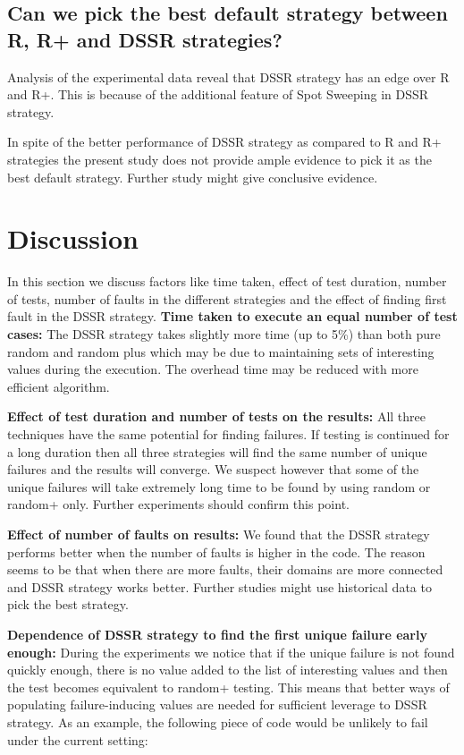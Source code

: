 \documentclass{acm_proc_article-sp}
\begin{document}
\subsection{Can we pick the best default strategy between R, R+ and DSSR strategies?}

Analysis of the experimental data reveal that DSSR strategy has an edge over R and R+. This is because of the additional feature of Spot Sweeping in DSSR strategy.

In spite of the better performance of DSSR strategy as compared to R and R+ strategies the present study does not provide ample evidence to pick it as the best default strategy. Further study might give conclusive evidence. 





\section{Discussion}\label{sec:discussion}
In this section we discuss factors like time taken, effect of test duration, number of tests, number of faults in the different strategies and the effect of finding first fault in the DSSR strategy.
\textbf{Time taken to execute an equal number of test cases:}
The DSSR strategy takes slightly more time (up to 5\%) than both pure random and random plus which may be due to maintaining sets of interesting values during the execution. The overhead time may be reduced with more efficient algorithm. 

\textbf{Effect of test duration and number of tests on the results:}
All three techniques have the same potential for finding failures. If testing is continued for a long duration then all three strategies will find the same number of unique failures and the results will converge. We suspect however that some of the unique failures will take extremely long time to be found by using random or random+ only. Further experiments should confirm this point.


\textbf{Effect of number of faults on results:} 
We found that the DSSR strategy performs better when the number of faults is higher in the code. The reason seems to be that when there are more faults, their domains are more connected and DSSR strategy works better. Further studies might use historical data to pick the best strategy.

\textbf{Dependence of DSSR strategy to find the first unique failure early enough:}
During the experiments we notice that if the unique failure is not found  quickly enough, there is no value added to the list of interesting values and then the test becomes equivalent to random+ testing. This means that better ways of populating failure-inducing values are needed for sufficient leverage to DSSR strategy. As an example, the following piece of code would be unlikely to fail under the current setting:
\end{document}
